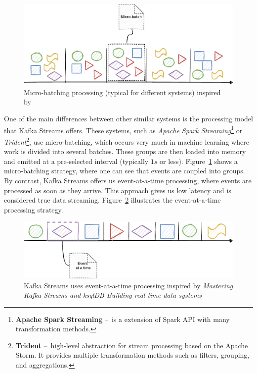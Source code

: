 \begin{figure}[!ht]
    \centering
    \includegraphics[scale=0.78]{obrazky-figures/02-preliminaries/02-kafka/10-kafkaStreamsProces}
    \caption{Micro-batching processing (typical for different systems) inspired by~\cite{kafkaStreamsBook}}
    \label{fig:02-kafkaStreamsProcessingBatch}
\end{figure}

One of the main differences between other similar systems is the processing model that Kafka Streams offers.
These systems, such as \emph{Apache Spark Streaming}\footnote{\textbf{Apache Spark Streaming} \---\ is a extension of Spark API with many transformation methods.} or \emph{Trident}\footnote{\textbf{Trident} \---\ high-level abstraction for stream processing based on the Apache Storm. It provides multiple transformation methods such as filters, grouping, and aggregations.}, use micro-batching, which occurs very much in machine learning where work is divided into several batches.
These groups are then loaded into memory and emitted at a pre-selected interval (typically $1s$ or less).
Figure~\ref{fig:02-kafkaStreamsProcessingBatch} shows a micro-batching strategy, where one can see that events are coupled into groups.
By contrast, Kafka Streams offers us event-at-a-time processing, where events are processed as soon as they arrive.
This approach gives us low latency and is considered true data streaming. Figure~\ref{fig:02-kafkaStreamsProcessingEvent} illustrates the event-at-a-time processing strategy.
\begin{figure}[!ht]
    \centering
    \includegraphics[scale=0.88]{obrazky-figures/02-preliminaries/02-kafka/11-kafkaStreamsProces2}
    \caption{Kafka Streams uses event-at-a-time processing inspired by \emph{Mastering Kafka Streams and ksqlDB Building real-time data systems}~\cite{kafkaStreamsBook}}
    \label{fig:02-kafkaStreamsProcessingEvent}
\end{figure}

